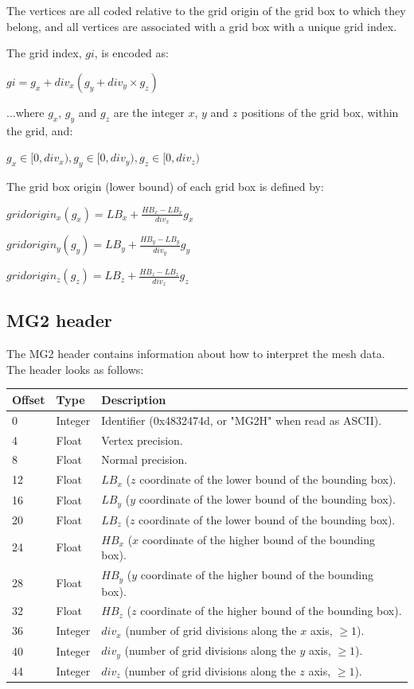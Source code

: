 The vertices are all coded relative to the grid origin of the grid box to which
they belong, and all vertices are associated with a grid box with a unique
grid index.

The grid index, $gi$, is encoded as:

$gi = g_x + div_x(g_y + div_y \times g_z)$

...where $g_x$, $g_y$ and $g_z$ are the integer $x$, $y$ and $z$ positions of the grid
box, within the grid, and:

$g_x \in [0, div_x), g_y \in [0, div_y), g_z \in [0, div_z)$

The grid box origin (lower bound) of each grid box is defined by:

$gridorigin_x(g_x) = LB_x + \frac{HB_x - LB_x}{div_x} g_x$

$gridorigin_y(g_y) = LB_y + \frac{HB_y - LB_y}{div_y} g_y$

$gridorigin_z(g_z) = LB_z + \frac{HB_z - LB_z}{div_z} g_z$


\subsection{MG2 header}
The MG2 header contains information about how to interpret the mesh data. The
header looks as follows:

\begin{tabular}{|l|l|l|}\hline
\textbf{Offset} &  \textbf{Type} & \textbf{Description}\\ \hline
0 & Integer & Identifier (0x4832474d, or "MG2H" when read as ASCII).\\ \hline
4 & Float & Vertex precision.\\ \hline
8 & Float & Normal precision.\\ \hline
12 & Float & $LB_x$ ($z$ coordinate of the lower bound of the bounding box).\\ \hline
16 & Float & $LB_y$ ($y$ coordinate of the lower bound of the bounding box).\\ \hline
20 & Float & $LB_z$ ($z$ coordinate of the lower bound of the bounding box).\\ \hline
24 & Float & $HB_x$ ($x$ coordinate of the higher bound of the bounding box).\\ \hline
28 & Float & $HB_y$ ($y$ coordinate of the higher bound of the bounding box).\\ \hline
32 & Float & $HB_z$ ($z$ coordinate of the higher bound of the bounding box).\\ \hline
36 & Integer & $div_x$ (number of grid divisions along the $x$ axis, $\geq 1$).\\ \hline
40 & Integer & $div_y$ (number of grid divisions along the $y$ axis, $\geq 1$).\\ \hline
44 & Integer & $div_z$ (number of grid divisions along the $z$ axis, $\geq 1$).\\ \hline
\end{tabular}


